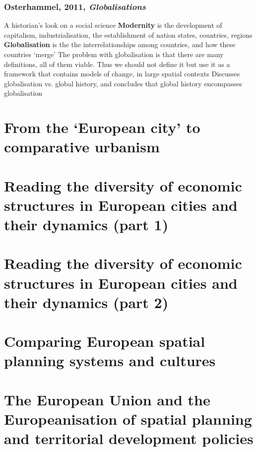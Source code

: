 \documentclass{article}
\begin{document}
\subsubsection{Osterhammel, 2011, \textit{Globalisations}}


\begin{outline}
	\1 A historian's look on a social science
	\1 \textbf{Modernity} is the development of capitalism, industrialisation, the establishment of nation states, countries, regions
	\1 \textbf{Globalisation} is the the interrelationships among countries, and how these countries `merge'
	\1 The problem with globalisation is that there are many definitions, all of them viable. Thus we should not define it but use it as a framework that contains models of change, in large spatial contexts
	\1 Discusses globalisation vs. global history, and concludes that global history encompasses globalisation
\end{outline}


\subsection{}

\section{From the `European city' to comparative urbanism}
\date{November th, 2021}

\section{Reading the diversity of economic structures in European cities and their dynamics (part 1)}
\date{October 18th, 2021}


\section{Reading the diversity of economic structures in European cities and their dynamics (part 2)}
\date{October 25th, 2021}

\section{Comparing European spatial planning systems and cultures}
\date{November 8th, 2021}


\section{The European Union and the Europeanisation of spatial planning and territorial development policies}
\date{November 9th, 2021}
\end{document}
